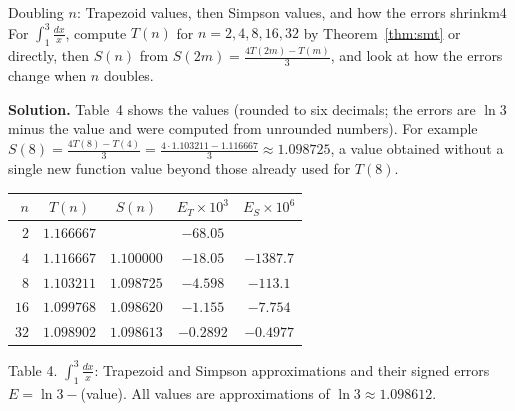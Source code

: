\documentclass[11pt]{article}
\begin{document}
\begin{exmp}{Doubling $n$: Trapezoid values, then Simpson values, and how the errors shrink}{m4}
For $\int_1^3\frac{dx}x$, compute $T(n)$ for $n=2,4,8,16,32$ by Theorem~\ref{thm:smt} or directly, then $S(n)$ from $S(2m)=\frac{4T(2m)-T(m)}3$, and look at how the errors change when $n$ doubles.

\textbf{Solution.} Table~4 shows the values (rounded to six decimals; the errors are $\ln3$ minus the value and were computed from unrounded numbers). For example $S(8)=\frac{4T(8)-T(4)}3=\frac{4\cdot1.103211-1.116667}3\approx1.098725$, a value obtained without a single new function value beyond those already used for $T(8)$.
\begin{center}
\begin{tabular}{rcccc}
\toprule $n$ & $T(n)$ & $S(n)$ & $E_T\times10^{3}$ & $E_S\times10^{6}$\\\midrule
$2$ & $1.166667$ & & $-68.05$ & \\
$4$ & $1.116667$ & $1.100000$ & $-18.05$ & $-1387.7$\\
$8$ & $1.103211$ & $1.098725$ & $-4.598$ & $-113.1$\\
$16$ & $1.099768$ & $1.098620$ & $-1.155$ & $-7.754$\\
$32$ & $1.098902$ & $1.098613$ & $-0.2892$ & $-0.4977$\\\bottomrule
\end{tabular}
\end{center}
\begin{center}\small Table 4. $\int_1^3\frac{dx}x$: Trapezoid and Simpson approximations and their signed errors $E=\ln3-{}$(value). All values are approximations of $\ln3\approx1.098612$.\end{center}

\end{exmp}
\end{document}
